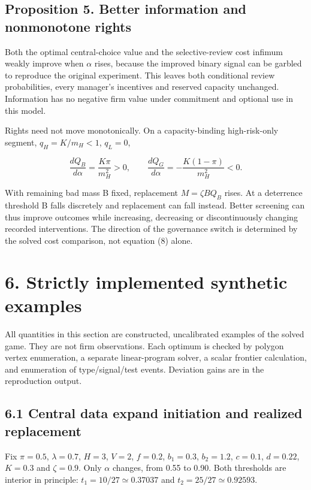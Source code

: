 \documentclass[
  11pt,
]{article}
\begin{document}
\subsection{Proposition 5. Better information and nonmonotone
rights}\label{proposition-5.-better-information-and-nonmonotone-rights}

Both the optimal central-choice value and the selective-review cost
infimum weakly improve when \(\alpha\) rises, because the improved
binary signal can be garbled to reproduce the original experiment. This
leaves both conditional review probabilities, every manager's incentives
and reserved capacity unchanged. Information has no negative firm value
under commitment and optional use in this model.

Rights need not move monotonically. On a capacity-binding high-risk-only
segment, \(q_H=K/m_H<1\), \(q_L=0\),

\[\frac{dQ_B}{d\alpha}=\frac{K\pi}{m_H^2}>0,\qquad
\frac{dQ_G}{d\alpha}=-\frac{K(1-\pi)}{m_H^2}<0. \tag{8}\]

With remaining bad mass B fixed, replacement \(M=\zeta BQ_B\) rises. At
a deterrence threshold B falls discretely and replacement can fall
instead. Better screening can thus improve outcomes while increasing,
decreasing or discontinuously changing recorded interventions. The
direction of the governance switch is determined by the solved cost
comparison, not equation (8) alone.

\section{6. Strictly implemented synthetic
examples}\label{strictly-implemented-synthetic-examples}

All quantities in this section are constructed, uncalibrated examples of
the solved game. They are not firm observations. Each optimum is checked
by polygon vertex enumeration, a separate linear-program solver, a
scalar frontier calculation, and enumeration of type/signal/test events.
Deviation gains are in the reproduction output.

\subsection{6.1 Central data expand initiation and realized
replacement}\label{central-data-expand-initiation-and-realized-replacement}

Fix \(\pi=0.5\), \(\lambda=0.7\), \(H=3\), \(V=2\), \(f=0.2\),
\(b_1=0.3\), \(b_2=1.2\), \(c=0.1\), \(d=0.22\), \(K=0.3\) and
\(\zeta=0.9\). Only \(\alpha\) changes, from 0.55 to 0.90. Both
thresholds are interior in principle: \(t_1=10/27\simeq0.37037\) and
\(t_2=25/27\simeq0.92593\).
\end{document}
